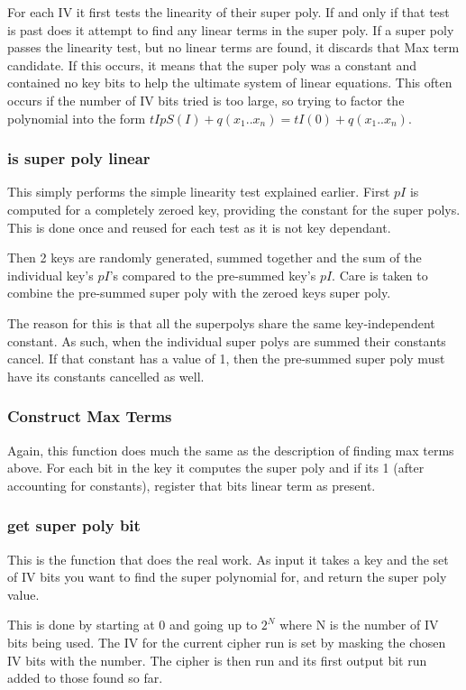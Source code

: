\documentclass{report}
\let\Oldsubsubsection\subsubsection
\renewcommand{\subsubsection}{\FloatBarrier\Oldsubsubsection}
\begin{document}
For each IV it first tests the linearity of their super poly. If and only if that test is past does it attempt to find any linear terms in the super poly. If a super poly passes the linearity test, but no linear terms are found, it discards that Max term candidate. If this occurs, it means that the super poly was a constant and contained no key bits to help the ultimate system of linear equations. This often occurs if the number of IV bits tried is too large, so trying to factor the polynomial into the form $tIpS(I)+q(x_1..x_n)=tI(0)+q(x_1..x_n)$.

\subsubsection{is super poly linear}
This simply performs the simple linearity test explained earlier. First $pI$ is computed for a completely zeroed key, providing the constant for the super polys. This is done once and reused for each test as it is not key dependant.

Then 2 keys are randomly generated, summed together and the sum of the individual key's $pI$'s compared to the pre-summed key's $pI$. Care is taken to combine the pre-summed super poly with the zeroed keys super poly.

The reason for this is that all the superpolys share the same key-independent constant. As such, when the individual super polys are summed their constants cancel. If that constant has a value of 1, then the pre-summed super poly must have its constants cancelled as well.

\subsubsection{Construct Max Terms}
Again, this function does much the same as the description of finding max terms above. For each bit in the key it computes the super poly and if its 1 (after accounting for constants), register that bits linear term as present.
\subsubsection{get super poly bit}
This is the function that does the real work. As input it takes a key and the set of IV bits you want to find the super polynomial for, and return the super poly value.

This is done by starting at 0 and going up to $2^N$ where N is the number of IV bits being used. The IV for the current cipher run is set by masking the chosen IV bits with the number. The cipher is then run and its first output bit run added to those found so far.
\end{document}
